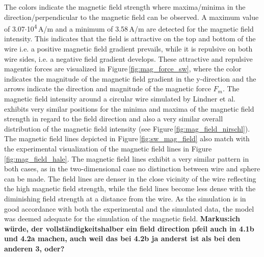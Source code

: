 The colors indicate the magnetic field strength where maxima/minima in the direction/perpendicular to the magnetic field can be observed. A maximum value of 3.07$\cdotp$10\textsuperscript{4}\,A/m and a minimum of 3.58\,A/m are detected for the magnetic field intensity. This indicates that the field is attractive on the top and bottom of the wire i.e. a positive magnetic field gradient prevails, while it is repulsive on both wire sides, i.e. a negative field gradient develops. These attractive and repulsive magentic forces are visualized in Figure\,\ref{fig:mag_force_sw}, where the color indicates the magnitude of the magnetic field gradient in the y-direction and the arrows indicate the direction and magnitude of the magnetic force $F_{m}$. The magnetic field intensity around a circular wire simulated by Lindner et al. \cite{lindner2013simulation} exhibits very similar positions for the minima and maxima of the magnetic field strength in regard to the field direction and also a very similar overall distribution of the magnetic field intensity (see Figure\,\ref{fig:mag_field_nirschl}). The magnetic field lines depicted in Figure\,\ref{fig:sw_mag_field} also match with the experimental visualization of the magnetic field lines in Figure\,\ref{fig:mag_field_hale}. The magnetic field lines exhibit a very similar pattern in both cases, as in the two-dimensional case no distinction between wire and sphere can be made. The field lines are denser in the close vicinity of the wire reflecting the high magnetic field strength, while the field lines become less dense with the diminishing field strength at a distance from the wire. As the simulation is in good accordance with both the experimental and the simulated data, the model was deemed adequate for the simulation of the magnetic field. \textbf{Markus:ich würde, der vollständigkeitshalber ein field direction pfeil auch in 4.1b und 4.2a machen, auch weil das bei 4.2b ja anderst ist als bei den anderen 3, oder?}  

